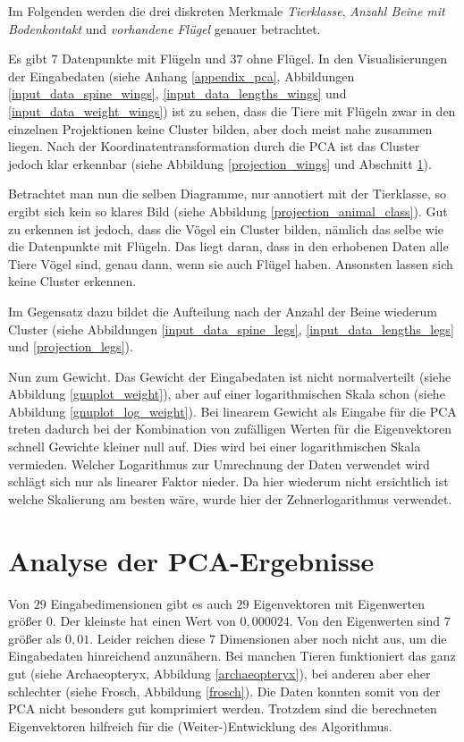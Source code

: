  
 Im Folgenden werden die drei diskreten Merkmale \emph{Tierklasse}, \emph{Anzahl Beine mit Bodenkontakt} und \emph{vorhandene Flügel} genauer betrachtet.
 
 Es gibt $7$ Datenpunkte mit Flügeln und $37$ ohne Flügel. In den Visualisierungen der Eingabedaten (siehe Anhang \ref{appendix_pca}, Abbildungen \ref{input_data_spine_wings}, \ref{input_data_lengths_wings} und \ref{input_data_weight_wings}) ist zu sehen, dass die Tiere mit Flügeln zwar in den einzelnen Projektionen keine Cluster bilden, aber doch meist nahe zusammen liegen. Nach der Koordinatentransformation durch die PCA ist das Cluster jedoch klar erkennbar (siehe Abbildung \ref{projection_wings} und Abschnitt \ref{section_pca_result_analysis}).
 
 Betrachtet man nun die selben Diagramme, nur annotiert mit der Tierklasse, so ergibt sich kein so klares Bild (siehe Abbildung \ref{projection_animal_class}). Gut zu erkennen ist jedoch, dass die Vögel ein Cluster bilden, nämlich das selbe wie die Datenpunkte mit Flügeln. Das liegt daran, dass in den erhobenen Daten alle Tiere Vögel sind, genau dann, wenn sie auch Flügel haben. Ansonsten lassen sich keine Cluster erkennen.
 
 Im Gegensatz dazu bildet die Aufteilung nach der Anzahl der Beine wiederum Cluster (siehe Abbildungen \ref{input_data_spine_legs}, \ref{input_data_lengths_legs} und \ref{projection_legs}).
 

 Nun zum Gewicht. Das Gewicht der Eingabedaten ist nicht normalverteilt (siehe Abbildung \ref{gnuplot_weight}), aber auf einer logarithmischen Skala schon (siehe Abbildung \ref{gnuplot_log_weight}). 
 Bei linearem Gewicht als Eingabe für die PCA treten dadurch bei der Kombination von zufälligen Werten für die Eigenvektoren schnell Gewichte kleiner null auf. Dies wird bei einer logarithmischen Skala vermieden.
 Welcher Logarithmus zur Umrechnung der Daten verwendet wird schlägt sich nur als linearer Faktor nieder. Da hier wiederum nicht ersichtlich ist welche Skalierung am besten wäre, wurde hier der Zehnerlogarithmus verwendet.
 

 \section{Analyse der PCA-Ergebnisse}
 \label{section_pca_result_analysis}
 
 Von $29$ Eingabedimensionen gibt es auch $29$ Eigenvektoren mit Eigenwerten größer $0$. Der kleinste hat einen Wert von $0,000024$. Von den Eigenwerten sind $7$ größer als $0,01$. Leider reichen diese $7$ Dimensionen aber noch nicht aus, um die Eingabedaten hinreichend anzunähern. Bei manchen Tieren funktioniert das ganz gut (siehe Archaeopteryx, Abbildung \ref{archaeopteryx}), bei anderen aber eher schlechter (siehe Frosch, Abbildung \ref{frosch}). Die Daten konnten somit von der PCA nicht besonders gut komprimiert werden. Trotzdem sind die berechneten Eigenvektoren hilfreich für die (Weiter-)Entwicklung des Algorithmus. 
 
